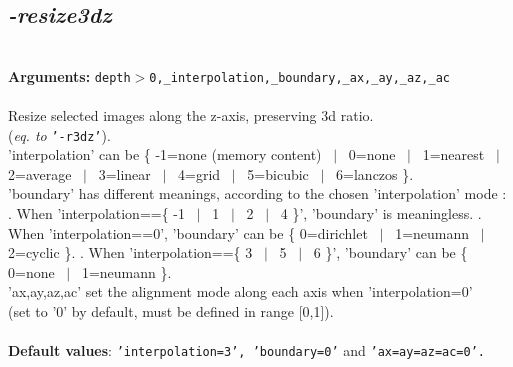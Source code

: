 \documentclass[a4paper,11pt,twoside]{book}
\begin{document}
\subsection{\emph{-resize3dz} }\vspace*{-0.5em}
~\\\textbf{Arguments: } 
{\small \texttt{depth$>$0,\_interpolation,\_boundary,\_ax,\_ay,\_az,\_ac}}\\~\\
Resize selected images along the z-axis, preserving 3d ratio.
~\\(\emph{eq. to} {\small \texttt{'-r3dz'}}).
~\\'interpolation' can be \{ -1=none (memory content) ~$|$~ 0=none ~$|$~ 1=nearest ~$|$~ 2=average ~$|$~ 3=linear ~$|$~ 4=grid ~$|$~ 5=bicubic ~$|$~ 6=lanczos \}.
~\\'boundary' has different meanings, according to the chosen 'interpolation' mode :
. When 'interpolation==\{ -1 ~$|$~ 1 ~$|$~ 2 ~$|$~ 4 \}', 'boundary' is meaningless.
. When 'interpolation==0', 'boundary' can be \{ 0=dirichlet ~$|$~ 1=neumann ~$|$~ 2=cyclic \}.
. When 'interpolation==\{ 3 ~$|$~ 5 ~$|$~ 6 \}', 'boundary' can be \{ 0=none ~$|$~ 1=neumann \}.
~\\'ax,ay,az,ac' set the alignment mode along each axis when 'interpolation=0'
~\\(set to '0' by default, must be defined in range [0,1]).
~\\~\\\textbf{Default values}: {\small \texttt{'interpolation=3', 'boundary=0'} and \texttt{'ax=ay=az=ac=0'.}}
\end{document}
